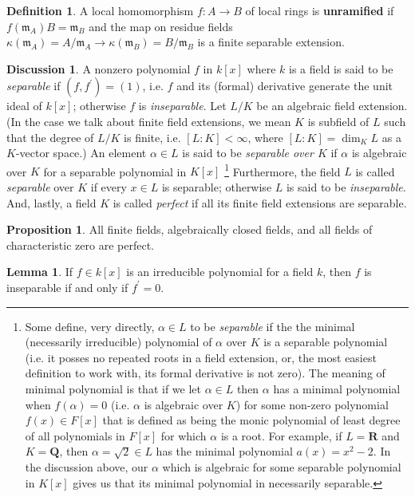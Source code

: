 \documentclass[oneside]{amsart}
\theoremstyle{definition}
\newtheorem{defi}{Definition}[section]
\newtheorem{lemma}{Lemma}[section]
\newtheorem{prop}{Proposition}[section]
\newtheorem{disc}{Discussion}[section]
\newcommand{\rr}{\mathbf R}
\newcommand{\qq}{\mathbf Q}
\begin{document}
\begin{defi} \label{def: 1.1}
A local homomorphism $f \colon A \to B$ of local rings is \textbf{unramified} if $f(\mathfrak m_A) B = \mathfrak m_B$ and the map on residue fields $ \kappa(\mathfrak m_A) = A / \mathfrak m_A \to \kappa (\mathfrak m _B) = B / \mathfrak m_B$ is a finite separable extension. 
\end{defi}
\begin{disc}\label{disc: 1.1} A nonzero polynomial $f$ in $k[x]$ where $k$ is a field is said to be \textit{separable} if $(f, f^\prime ) = (1)$, i.e. $f$ and its (formal) derivative generate the unit ideal of $k[x]$; otherwise $f$ is \textit{inseparable}. Let $L/K$ be an algebraic field extension. (In the case we talk about finite field extensions, we mean $K$ is subfield of $L$ such that the degree of $L/K$ is finite, i.e. $[L \colon K ] < \infty$, where $[L \colon K] = \dim_K L$ as a $K$-vector space.) An element $\alpha \in L$ is said to be \textit{separable over $K$} if $\alpha$ is algebraic over $K$ for a separable polynomial in $K[x]$ \footnote{Some define, very directly, $\alpha \in L$ to be \textit{separable} if the the minimal (necessarily irreducible) polynomial of $\alpha $ over $K$ is a separable polynomial (i.e. it posses no repeated roots in a field extension, or, the most easiest definition to work with, its formal derivative is not zero). The meaning of minimal polynomial is that if we let $\alpha \in L$ then $\alpha$ has a minimal polynomial when $f(\alpha) = 0$ (i.e. $\alpha$ is algebraic over $K$) for some non-zero polynomial $f(x) \in F[x]$ that is defined as being the monic polynomial of least degree of all polynomials in $F[x]$ for which $\alpha$ is a root. For example, if $L = \rr$ and $K = \qq$, then $\alpha = \sqrt{2} \in L$ has the minimal polynomial $a (x) = x^2-2$. In the discussion above, our $\alpha $ which is algebraic for some separable polynomial in $K[x]$ gives us that its minimal polynomial in necessarily separable.} Furthermore, the field $L$ is called \textit{separable} over $K$ if every $x \in L$ is separable; otherwise $L$ is said to be \textit{inseparable}. And, lastly, a field $K$ is called \textit{perfect} if all its finite field extensions are separable. 
\begin{prop}
All finite fields, algebraically closed fields, and all fields of characteristic zero are perfect.	
\end{prop}
\begin{lemma} If $f \in k[x]$ is an irreducible polynomial for a field $k$, then $f$ is inseparable if and only if $f^\prime = 0$.	

\end{lemma}
\end{disc}
\end{document}
